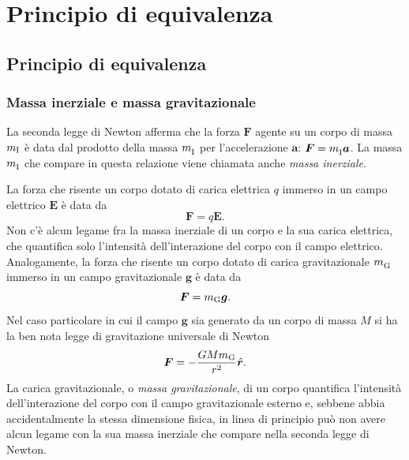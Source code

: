 \cleardoublepage
\chapter{Principio di equivalenza}
\label{cha:principio-equivalenza}

\section{Principio di equivalenza}
\label{sec:principio-equivalenza}

\subsection{Massa inerziale e massa gravitazionale}
\label{sec:massa-inerz-grav}

La seconda legge di Newton afferma che la forza $\bm{F}$ agente su un corpo di
massa $m_{\textup{I}}$ è data dal prodotto della massa $m_{\textup{I}}^{}$
per l'accelerazione $\bm{a}$: $\bm{F} = m_{\textup{I}}^{}\bm{a}$.
La massa $m_{\textup{I}}^{}$
che compare in questa relazione viene chiamata anche
\emph{massa inerziale}.

La forza che risente un corpo dotato di carica elettrica $q$ immerso in un campo
elettrico $\bm{E}$ è data da
\begin{equation}
  \bm{F} = q\bm{E}.
\end{equation}
Non c'è alcun legame fra la massa inerziale di un corpo e la sua carica
elettrica, che quantifica solo l'intensità dell'interazione del corpo con il
campo elettrico.  Analogamente, la forza che risente un corpo dotato di carica
gravitazionale $m_{\textup{G}}^{}$ immerso in un campo gravitazionale $\bm{g}$ è
data da
\begin{equation}
  \bm{F} = m_{\textup{G}} \bm{g}.
\end{equation}
Nel caso particolare in cui il campo $\bm{g}$ sia generato da un corpo di massa
$M$ si ha la ben nota legge di
gravitazione universale di Newton
\begin{equation}
  \bm{F} = -\frac{GMm_{\textup{G}}}{r^{2}}\hat{\bm{r}}.
\end{equation}
La carica gravitazionale, o \emph{massa gravitazionale}, di un corpo quantifica
l'intensità dell'interazione del corpo con il campo gravitazionale esterno e,
sebbene abbia accidentalmente la stessa dimensione fisica, in linea di principio
può non avere alcun legame con la sua massa inerziale che compare nella seconda
legge di Newton.

